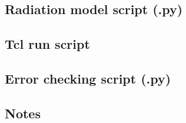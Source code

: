 \topbar

\bottombar

\subsection{Radiation model script (.py)}

\topbar

\bottombar

\subsection{Tcl run script}
\topbar

\bottombar

\subsection{Error checking script (.py)}
\topbar

\bottombar

\subsection{Notes}
